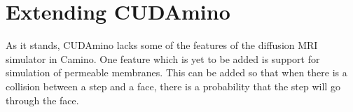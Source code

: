 \begin{comment}
\begin{itemize}
\item Test dependence on initialisation of points properly
  \begin{itemize}
    \item Dependence on number of points
    \item Dependence on arrangement of points
    \item Dependence on definition of connectivity
  \end{itemize}
\item Better methods for generation of points
  \begin{itemize}
    \item Generate points only in the neighbourhood of actual growth area
    \item Maybe generate cloud around the desired path of the fibre. 
  \end{itemize}
\item Finding best step
  \begin{itemize}
    \item Add distance to desired path (maybe replace dot-product)
    \item Allow non-straight paths
    \item Add information from second neighbours (maybe connectivity of second neighbours - prefer moving towards places with high connectivity, meaning fewer occupied nodes).
  \end{itemize}
\item Updating network
  \begin{itemize}
  \item Nudge nodes which are close to the surface of the fibre toward free space
  \end{itemize}
\end{itemize}
\end{comment}

\section{Extending CUDAmino}
\label{sec:future_cudamino}

As it stands, CUDAmino lacks some of the features of the diffusion MRI simulator in Camino.
One feature which is yet to be added is support for simulation of permeable membranes.
This can be added so that when there is a collision between a step and a face, there is a probability that the step will go through the face.

